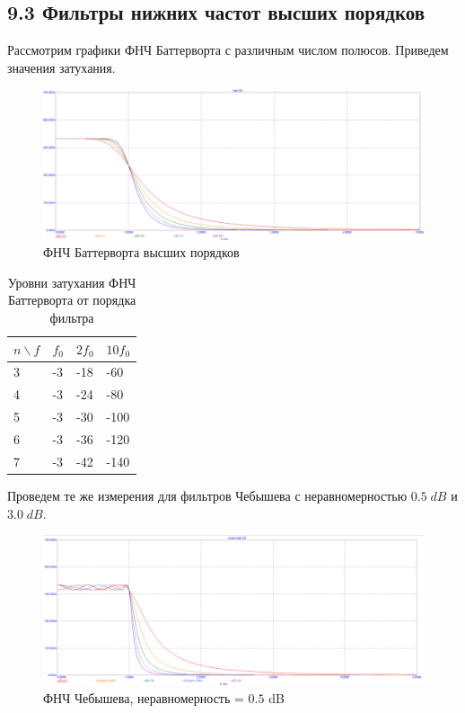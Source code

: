 \documentclass[12pt,a4paper]{article}
\begin{document}
	\subsection*{9.3 Фильтры нижних частот высших порядков}
	
	Рассмотрим графики ФНЧ Баттерворта с различным числом полюсов. Приведем значения затухания.
	\begin{figure}[H]
		\centering
		\includegraphics[width=1.0\linewidth]{res/batt.png}
		\caption{ФНЧ Баттерворта высших порядков}
		\label{phase}
	\end{figure}
		
	\begin{table}[H]
		\begin{tabular}{llll}
			\hline
			$n \backslash f$ & $f_0$ & $2f_0$ & $10f_0$ \\ \hline
			3     & -3    & -18    & -60     \\
			4     & -3    & -24    & -80     \\
			5     & -3    & -30    & -100    \\
			6     & -3    & -36    & -120    \\
			7     & -3    & -42    & -140    \\ \hline
		\end{tabular}
		\caption{Уровни затухания ФНЧ Баттерворта от порядка фильтра}
	\end{table}

	Проведем те же измерения для фильтров Чебышева с неравномерностью $0.5 \; dB$ и $3.0 \; dB$.
	\begin{figure}[H]
		\centering
		\includegraphics[width=1.0\linewidth]{res/cheb05.png}
		\caption{ФНЧ Чебышева, неравномерность = $0.5$ dB}
		\label{phase}
	\end{figure}
	
\end{document}
